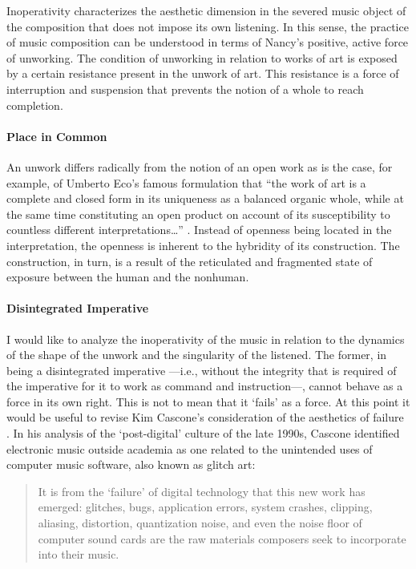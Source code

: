 Inoperativity characterizes the aesthetic dimension in the severed music object of the composition that does not impose its own listening. In this sense, the practice of music composition can be understood in terms of Nancy's positive, active force of unworking. The condition of unworking in relation to works of art is exposed by a certain resistance present in the unwork of art. This resistance is a force of interruption and suspension that prevents the notion of a whole to reach completion.

\paragraph{Place in Common}
An unwork differs radically from the notion of an open work as is the case, for example, of Umberto Eco's famous formulation that ``the work of art is a complete and closed form in its uniqueness as a balanced organic whole, while at the same time constituting an open product on account of its susceptibility to countless different interpretations\dots'' \parencite{Eco04:The}. Instead of openness being located in the interpretation, the openness is inherent to the hybridity of its construction. The construction, in turn, is a result of the reticulated and fragmented state of exposure between the human and the nonhuman. %

\paragraph{Disintegrated Imperative}
I would like to analyze the inoperativity of the music in relation to the dynamics of the shape of the unwork and the singularity of the listened. The former, in being a disintegrated imperative ---i.e., without the integrity that is required of the imperative for it to work as command and instruction---, cannot behave as a force in its own right. This is not to mean that it `fails' as a force. At this point it would be useful to revise Kim Cascone's consideration of the aesthetics of failure \parencite{Cas00:The}. In his analysis of the `post-digital' culture of the late 1990s, Cascone identified electronic music outside academia as one related to the unintended uses of computer music software, also known as glitch art:

\begin{quote}
	It is from the `failure' of digital technology that this new work has emerged: glitches, bugs, application errors, system crashes, clipping, aliasing, distortion, quantization noise, and even the noise floor of computer sound cards are the raw materials composers seek to incorporate into their music. \parencite[13]{Cas00:The}
\end{quote}


